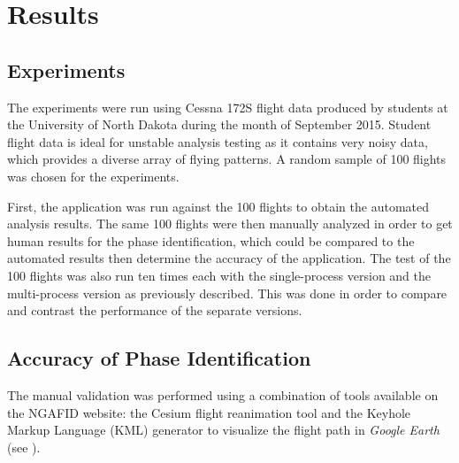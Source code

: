 
\chapter{Results} \label{ch:results}

\section{Experiments}

	The experiments were run using Cessna 172S flight data produced by students at the University of North Dakota during the month of September 2015.  Student flight data is ideal for unstable analysis testing as it contains very noisy data, which provides a diverse array of flying patterns.  A random sample of 100 flights was chosen for the experiments.
        
    First, the application was run against the 100 flights to obtain the automated analysis results.  The same 100 flights were then manually analyzed in order to get human results for the phase identification, which could be compared to the automated results then determine the accuracy of the application.  The test of the 100 flights was also run ten times each with the single-process version and the multi-process version as previously described.  This was done in order to compare and contrast the performance of the separate versions.


\section{Accuracy of Phase Identification}

	The manual validation was performed using a combination of tools available on the NGAFID website:  the Cesium flight reanimation tool and the Keyhole Markup Language (KML) generator to visualize the flight path in \textit{Google Earth}~\cite{nolan2014keyhole} (see ).
    
